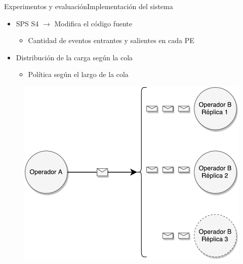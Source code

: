 \addtocounter{framenumber}{-1}
\begin{frame}{Experimentos y evaluación}{Implementación del sistema}
\begin{itemize}
\item SPS S4 $\rightarrow$ Modifica el código fuente
	\begin{itemize}
		\item Cantidad de eventos entrantes y salientes en cada PE
	\end{itemize}
\item Distribución de la carga según la cola
	\begin{itemize}
		\item Política según el largo de la cola
	\end{itemize}
\end{itemize}

\begin{figure}
  \center
    \includegraphics[scale=0.35]{images/DistribucionCarga-II.pdf}
\end{figure}
\end{frame}

